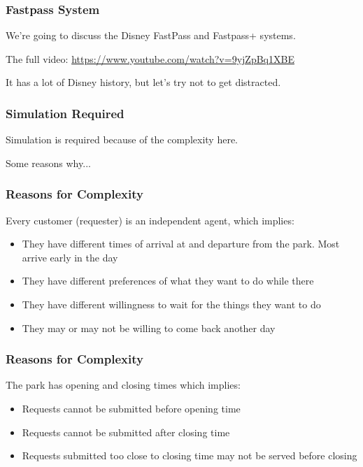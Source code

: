 \begin{frame}
\frametitle{Fastpass System}

We're going to discuss the Disney FastPass and Fastpass+ systems.

The full video: \url{https://www.youtube.com/watch?v=9yjZpBq1XBE}

It has a lot of Disney history, but let's try not to get distracted.

\end{frame}


\begin{frame}
\frametitle{Simulation Required}

Simulation is required because of the complexity here.

Some reasons why...

\end{frame}


\begin{frame}
\frametitle{Reasons for Complexity}

Every customer (requester) is an independent agent, which implies:
		\begin{itemize}
			\item They have different times of arrival at and departure from the park. Most arrive early in the day
			\item They have different preferences of what they want to do while there
			\item They have different willingness to wait for the things they want to do
			\item They may or may not be willing to come back another day
		\end{itemize}


\end{frame}


\begin{frame}
\frametitle{Reasons for Complexity}


The park has opening and closing times which implies:
		\begin{itemize}
		\item Requests cannot be submitted before opening time
		\item Requests cannot be submitted after closing time
		\item Requests submitted too close to closing time may not be served before closing
		\end{itemize}


\end{frame}


